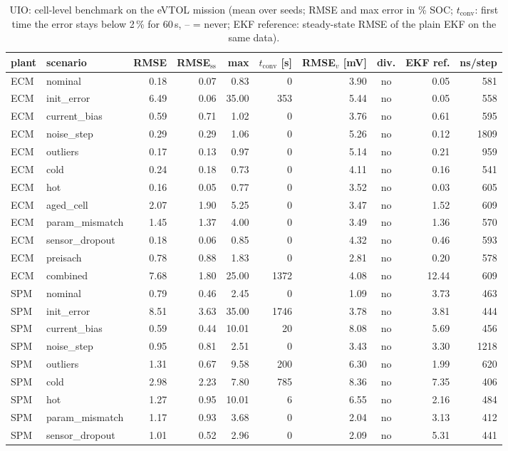 \begin{table}[H]\centering\footnotesize\setlength{\tabcolsep}{4pt}
\caption{UIO: cell-level benchmark on the eVTOL mission (mean over seeds; RMSE and max error in \% SOC; $t_\mathrm{conv}$: first time the error stays below 2\,\% for 60\,s, -- = never; EKF reference: steady-state RMSE of the plain EKF on the same data).}\label{tab:cell_UIO}
\begin{tabular}{llrrrrrcrr}\toprule
plant & scenario & RMSE & RMSE$_\mathrm{ss}$ & max & $t_\mathrm{conv}$ [s] & RMSE$_v$ [mV] & div. & EKF ref. & ns/step \\ \midrule
ECM & nominal & 0.18 & 0.07 & 0.83 & 0 & 3.90 & no & 0.05 & 581 \\
ECM & init\_error & 6.49 & 0.06 & 35.00 & 353 & 5.44 & no & 0.05 & 558 \\
ECM & current\_bias & 0.59 & 0.71 & 1.02 & 0 & 3.76 & no & 0.61 & 595 \\
ECM & noise\_step & 0.29 & 0.29 & 1.06 & 0 & 5.26 & no & 0.12 & 1809 \\
ECM & outliers & 0.17 & 0.13 & 0.97 & 0 & 5.14 & no & 0.21 & 959 \\
ECM & cold & 0.24 & 0.18 & 0.73 & 0 & 4.11 & no & 0.16 & 541 \\
ECM & hot & 0.16 & 0.05 & 0.77 & 0 & 3.52 & no & 0.03 & 605 \\
ECM & aged\_cell & 2.07 & 1.90 & 5.25 & 0 & 3.47 & no & 1.52 & 609 \\
ECM & param\_mismatch & 1.45 & 1.37 & 4.00 & 0 & 3.49 & no & 1.36 & 570 \\
ECM & sensor\_dropout & 0.18 & 0.06 & 0.85 & 0 & 4.32 & no & 0.46 & 593 \\
ECM & preisach & 0.78 & 0.88 & 1.83 & 0 & 2.81 & no & 0.20 & 578 \\
ECM & combined & 7.68 & 1.80 & 25.00 & 1372 & 4.08 & no & 12.44 & 609 \\
\midrule
SPM & nominal & 0.79 & 0.46 & 2.45 & 0 & 1.09 & no & 3.73 & 463 \\
SPM & init\_error & 8.51 & 3.63 & 35.00 & 1746 & 3.78 & no & 3.81 & 444 \\
SPM & current\_bias & 0.59 & 0.44 & 10.01 & 20 & 8.08 & no & 5.69 & 456 \\
SPM & noise\_step & 0.95 & 0.81 & 2.51 & 0 & 3.43 & no & 3.30 & 1218 \\
SPM & outliers & 1.31 & 0.67 & 9.58 & 200 & 6.30 & no & 1.99 & 620 \\
SPM & cold & 2.98 & 2.23 & 7.80 & 785 & 8.36 & no & 7.35 & 406 \\
SPM & hot & 1.27 & 0.95 & 10.01 & 6 & 6.55 & no & 2.16 & 484 \\
SPM & param\_mismatch & 1.17 & 0.93 & 3.68 & 0 & 2.04 & no & 3.13 & 412 \\
SPM & sensor\_dropout & 1.01 & 0.52 & 2.96 & 0 & 2.09 & no & 5.31 & 441 \\
\bottomrule\end{tabular}\end{table}
